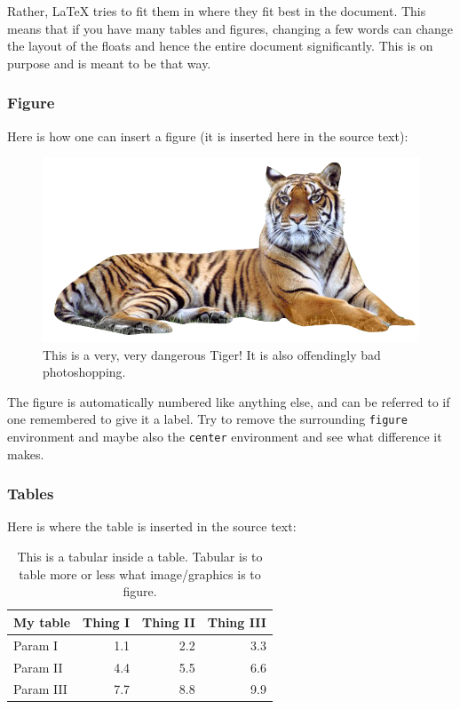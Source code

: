 \documentclass[a4paper, 11pt]{article} %
\begin{document}
Rather, \LaTeX{} tries to fit them in where they fit best in the document. This
means that if you have many tables and figures, changing a few words can change
the layout of the floats and hence the entire document significantly. This is on
purpose and is meant to be that way. 


\subsubsection{Figure}

Here is how one can insert a figure (it is inserted here in the source text):
\begin{figure}[h]
	\begin{center}
		\includegraphics[width=.75\textwidth]{./tiger.png}
	\end{center}
	\caption[Badly photoshopped tiger]{This is a very, very dangerous Tiger! It is also offendingly
	bad photoshopping.}
	\label{fig:tiger}
\end{figure}

The figure is automatically numbered like anything else, and can be referred to
if one remembered to give it a label. Try to remove the surrounding
\texttt{figure} environment and maybe also the \texttt{center} environment and
see what difference it makes.


\subsubsection{Tables}
Here is where the table is inserted in the source text:
\begin{table}
	\centering
	\begin{tabular}{|l|rrr|}
		\hline
		\textbf{My table} & Thing I & Thing II & Thing III \\
		\hline
		\hline
		Param I           & 1.1     & 2.2      & 3.3       \\
		Param II          & 4.4     & 5.5      & 6.6       \\
		Param III         & 7.7     & 8.8      & 9.9       \\
		\hline

	\end{tabular}
	\caption[Tabular/table]{This is a tabular inside a table. Tabular is to table more or
	less what image/graphics is to figure. }
	\label{tab:tabul}
\end{table}
\end{document}
